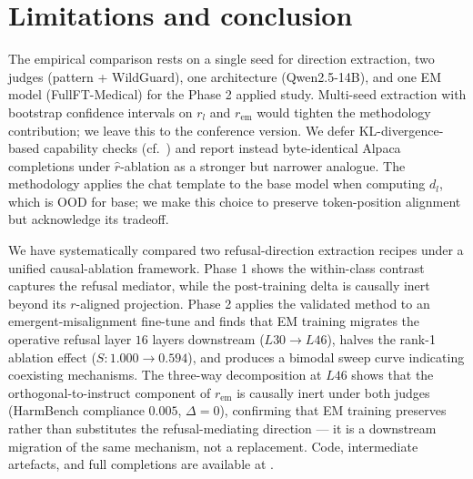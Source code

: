 \section{Limitations and conclusion}
\label{sec:lim}

The empirical comparison rests on a single seed for direction
extraction, two judges (pattern + WildGuard), one architecture
(Qwen2.5-14B), and one EM model (FullFT-Medical) for the Phase 2
applied study. Multi-seed extraction with bootstrap confidence
intervals on $r_l$ and $r_{\text{em}}$ would tighten the methodology
contribution; we leave this to the conference version. We defer
KL-divergence-based capability checks (cf.\
\citet{arditi2024refusal}) and report instead byte-identical Alpaca
completions under $\hat{r}$-ablation as a stronger but narrower
analogue. The methodology applies the chat template to the base
model when computing $d_l$, which is OOD for base; we make this
choice to preserve token-position alignment but acknowledge its
tradeoff.

We have systematically compared two refusal-direction extraction
recipes under a unified causal-ablation framework. Phase 1 shows the
within-class contrast captures the refusal mediator, while the
post-training delta is causally inert beyond its $r$-aligned
projection. Phase 2 applies the validated method to an
emergent-misalignment fine-tune and finds that EM training migrates
the operative refusal layer $16$ layers downstream
($L30 \to L46$), halves the rank-1 ablation effect ($S: 1.000 \to
0.594$), and produces a bimodal sweep curve indicating coexisting
mechanisms. The three-way decomposition at $L46$ shows that the
orthogonal-to-instruct component of $r_{\text{em}}$ is causally
inert under both judges (HarmBench compliance $0.005$,
$\Delta = 0$), confirming that EM training preserves rather than
substitutes the refusal-mediating direction --- it is a downstream
migration of the same mechanism, not a replacement.
Code, intermediate artefacts, and full completions are available at
\fillin{repo URL}.





